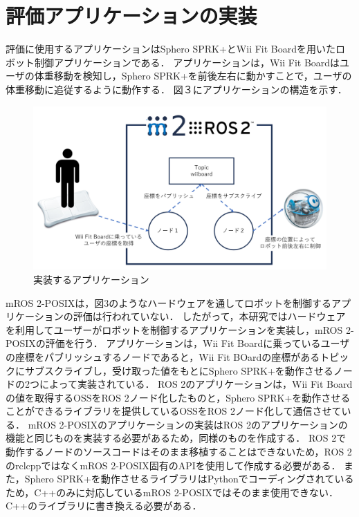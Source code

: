 \documentclass[11pt]{ujarticle}
\begin{document}
\section{評価アプリケーションの実装}
評価に使用するアプリケーションはSphero SPRK+とWii Fit Boardを用いたロボット制御アプリケーションである．
アプリケーションは，Wii Fit Boardはユーザの体重移動を検知し，Sphero SPRK+を前後左右に動かすことで，ユーザの体重移動に追従するように動作する．
図３にアプリケーションの構造を示す．
\begin{figure}[t]
	\centering
	\includegraphics[width=0.7\linewidth]{./src/fig3_application_structure.png}
	\caption{実装するアプリケーション}
  \label{fig:arch}
\end{figure}
mROS 2-POSIXは，図3のようなハードウェアを通してロボットを制御するアプリケーションの評価は行われていない．
したがって，本研究ではハードウェアを利用してユーザーがロボットを制御するアプリケーションを実装し，mROS 2-POSIXの評価を行う．
アプリケーションは，Wii Fit Boardに乗っているユーザの座標をパブリッシュするノードであると，Wii Fit BOardの座標があるトピックにサブスクライブし，受け取った値をもとにSphero SPRK+を動作させるノードの2つによって実装されている．
ROS 2のアプリケーションは，Wii Fit Boardの値を取得するOSSをROS 2ノード化したものと，Sphero SPRK+を動作させることができるライブラリを提供しているOSSをROS 2ノード化して通信させている．
mROS 2-POSIXのアプリケーションの実装はROS 2のアプリケーションの機能と同じものを実装する必要があるため，同様のものを作成する．
ROS 2で動作するノードのソースコードはそのまま移植することはできないため，ROS 2のrclcppではなくmROS 2-POSIX固有のAPIを使用して作成する必要がある．
また，Sphero SPRK+を動作させるライブラリはPythonでコーディングされているため，C++のみに対応しているmROS 2-POSIXではそのまま使用できない．
C++のライブラリに書き換える必要がある．
\end{document}
